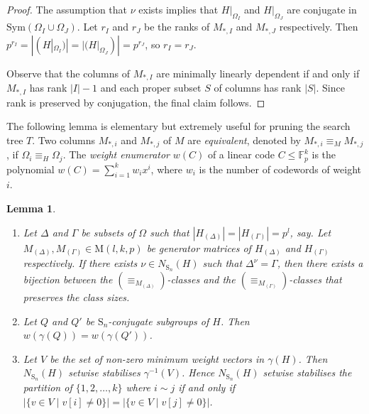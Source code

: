 \documentclass[11pt,a4paper]{article}
\newtheorem{lemma}[theorem]{Lemma}
\theoremstyle{definition}
\theoremstyle{remark}
\newcommand{\Sym}[0]{\mathrm{Sym}}
\newcommand{\Sy}{\mathrm{S}}
\begin{document}
\begin{proof}
The assumption that $\nu$ exists implies that  $H|_{\Omega_I}$ and $H|_{\Omega_J}$ are conjugate in $\Sym(\Omega_I \cup \Omega_J)$. Let $r_I$ and $r_J$ be the ranks of $M_{*,I}$ and $M_{*,J}$ respectively. Then $p^{r_I} = |(H|_{\Omega_I})|= |(H|_{\Omega_J})| = p^{r_J}$, 
so $r_I = r_J$. 

Observe that the columns of $M_{*,I}$ are minimally linearly dependent if and only if $M_{*,I}$ has rank $|I|-1$ and each proper subset $S$ of columns has rank $|S|$. Since rank is preserved by conjugation, the final claim follows. 
\end{proof}


The following lemma is elementary but extremely useful for pruning the search tree $T$. 
Two columns $M_{*,i}$ and $M_{*,j}$ of $M$ are \emph{equivalent}, denoted by $M_{*,i} \equiv_M M_{*,j}$, if $\Omega_i \equiv_H \Omega_j$. 
The \emph{weight enumerator} $w(C)$ of a linear code $C \leq \mathds{F}_p^k$ is the polynomial $w(C) = \sum_{i=1}^{k} w_i x^i$, where $w_i$ is the number of codewords of weight $i$.


\begin{lemma} \label{prune using weight}
\begin{enumerate}
    \item \label{prune by conjugacy classes of stab mats}
    Let $\Delta$ and ${\Gamma}$ be subsets of $\Omega$ such that $|H_{(\Delta)}| = |H_{(\Gamma)}| = p^l$, say. 
    Let $M_{(\Delta)} , M_{(\Gamma)} \in \mathrm{M}(l,k,p)$ be generator matrices of $H_{(\Delta)}$ and $H_{(\Gamma)}$ respectively. 
    If there exists $\nu \in N_{\Sy_n}(H)$ such that $\Delta^\nu = \Gamma$, then 
    there exists a bijection between the $(\equiv_{M_{(\Delta)}})$-classes and the $(\equiv_{M_{(\Gamma)}})$-classes that preserves the class sizes. 
    \item \label{conjugates have the same weight enumerator}
    Let $Q$ and $Q'$ be $\Sy_n$-conjugate subgroups of $H$. Then $w(\gamma(Q)) = w(\gamma(Q'))$.
    \item \label{min wt vec is invariant}
    Let $V$ be the set of non-zero minimum weight vectors in $\gamma(H)$. Then $N_{\Sy_n}(H)$ setwise stabilises $\gamma^{-1}(V)$.
    Hence $N_{\Sy_n}(H)$ setwise stabilises the partition of $\{ 1,2, \ldots, k \}$ where $i \sim j$ if and only if $|\{ v \in V \mid v[i] \neq 0\}| = |\{ v \in V \mid v[j] \neq 0\}|$.  
\end{enumerate}
\end{lemma}
\end{document}
